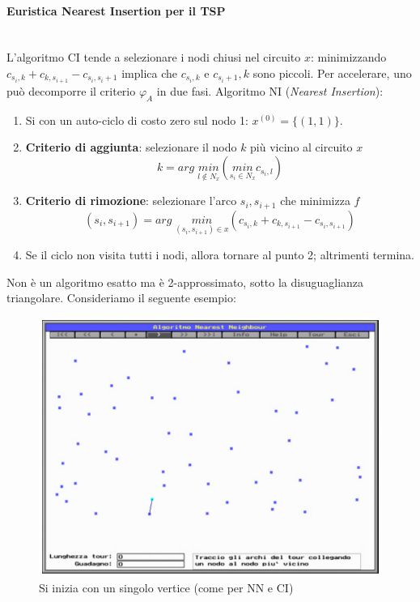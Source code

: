 \documentclass{article}
\begin{document}
    \paragraph{Euristica Nearest Insertion per il TSP}\mbox{}\\
    L'algoritmo CI tende a selezionare i nodi chiusi nel circuito $x$: minimizzando
$c_{s_i,k}+c_{k,s_{i+1}}-c_{s_i,s_i+1}$ implica che $c_{s_i,k}$ e $c_{s_i +1},k$ sono piccoli.
    Per accelerare, uno può decomporre il criterio $\varphi_A$ in due fasi. Algoritmo NI (\textit{Nearest Insertion}):
    \begin{enumerate}
        \item Si con un auto-ciclo di costo zero sul nodo 1: $x^{(0)}=\{(1,1)\}$.

        \item \textbf{Criterio di aggiunta}: selezionare il nodo $k$ più vicino al circuito $x$
              $$k=arg\;\underset{l \notin N_x}{min} \left( \underset{s_i \in N_x}{min}c_{s_i,l} \right)$$

        \item \textbf{Criterio di rimozione}: selezionare l'arco $s_i,s_{i+1}$ che minimizza $f$
              $$(s_i,s_{i+1})=arg\;\underset{(s_i,s_{i+1})\in x}{min} (c_{s_i,k}+c_{k,s_{i+1}}-c_{s_i,s_{i+1}})$$

        \item Se il ciclo non visita tutti i nodi, allora tornare al punto 2; altrimenti termina.
    \end{enumerate}
    Non è un algoritmo esatto ma è 2-approssimato, sotto la disuguaglianza triangolare. Consideriamo
    il seguente esempio:

    \begin{figure}[H]
        \centering
        \includegraphics[scale=0.5]{images/NI0.png}
        \caption{Si inizia con un singolo vertice (come per NN e CI)}
    \end{figure}
\end{document}
